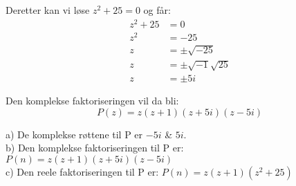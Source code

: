 \documentclass[12pt, a4paper]{article}
\begin{document}
\begin{flushleft}
Deretter kan vi løse $z^2 + 25 = 0$ og får:
\begin{equation}
    \begin{split}
        z^2 + 25 &= 0 \\
        z^2 &= -25 \\
        z &= \pm \sqrt{-25} \\
        z &= \pm \sqrt{-1} \sqrt{25} \\
        z &= \pm 5i
    \end{split}
\end{equation}
\newline

Den komplekse faktoriseringen vil da bli:
\begin{equation}
    P(z) = z(z + 1)(z + 5i)(z - 5i)
\end{equation}
\newline\newline


    a) De komplekse røttene til P er $-5i$ \& $5i$. \\
    b) Den komplekse faktoriseringen til P er: $P(n) = z(z + 1)(z + 5i)(z - 5i)$ \\
    c) Den reele faktoriseringen til P er: $P(n) = z(z + 1)(z^2 + 25)$ 
\end{flushleft}
\end{document}
